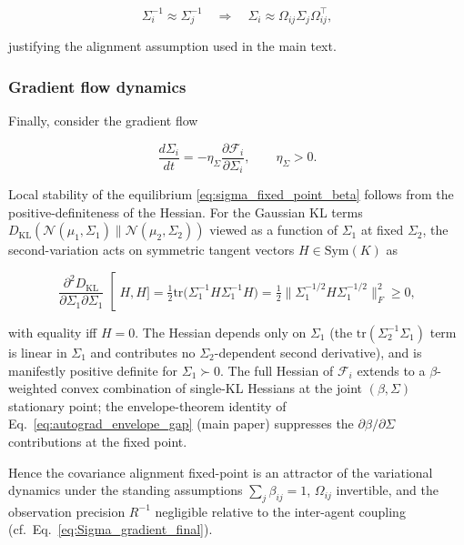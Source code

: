 \documentclass[twoside,11pt]{article}
\begin{document}
\begin{equation}
\Sigma_i^{-1} \approx \Sigma_j^{-1}
\quad\Longrightarrow\quad
\Sigma_i \approx \Omega_{ij}\Sigma_j\Omega_{ij}^\top,
\end{equation}

justifying the alignment assumption used in the main text.

\subsubsection{Gradient flow dynamics}

Finally, consider the gradient flow

\begin{equation}
\frac{d\Sigma_i}{dt}
=-\eta_\Sigma
\frac{\partial \mathcal{F}_i}{\partial \Sigma_i},
\qquad\eta_\Sigma > 0.
\end{equation}

Local stability of the equilibrium \eqref{eq:sigma_fixed_point_beta} follows from the positive-definiteness of the Hessian. For the Gaussian KL terms $D_{\mathrm{KL}}(\mathcal{N}(\mu_1,\Sigma_1) \| \mathcal{N}(\mu_2,\Sigma_2))$ viewed as a function of $\Sigma_1$ at fixed $\Sigma_2$, the second-variation acts on symmetric tangent vectors $H \in \mathrm{Sym}(K)$ as

\begin{equation}
\left.\frac{\partial^2 D_{\mathrm{KL}}}{\partial \Sigma_1 \partial \Sigma_1}\right[H, H]
=
\tfrac{1}{2} \mathrm{tr}\big(\Sigma_1^{-1} H \Sigma_1^{-1} H\big)
=
\tfrac{1}{2} \big\|\Sigma_1^{-1/2} H \Sigma_1^{-1/2}\big\|_F^2 \geq 0,
\end{equation}

with equality iff $H = 0$. The Hessian depends only on $\Sigma_1$ (the $\mathrm{tr}(\Sigma_2^{-1}\Sigma_1)$ term is linear in $\Sigma_1$ and contributes no $\Sigma_2$-dependent second derivative), and is manifestly positive definite for $\Sigma_1 \succ 0$. The full Hessian of $\mathcal{F}_i$ extends to a $\beta$-weighted convex combination of single-KL Hessians at the joint $(\beta, \Sigma)$ stationary point; the envelope-theorem identity of Eq.~\eqref{eq:autograd_envelope_gap} (main paper) suppresses the $\partial\beta/\partial \Sigma$ contributions at the fixed point.

Hence the covariance alignment fixed-point is an attractor of the variational dynamics under the standing assumptions $\sum_j \beta_{ij}=1$, $\Omega_{ij}$ invertible, and the observation precision $R^{-1}$ negligible relative to the inter-agent coupling (cf.\ Eq.~\eqref{eq:Sigma_gradient_final}).
\end{document}
